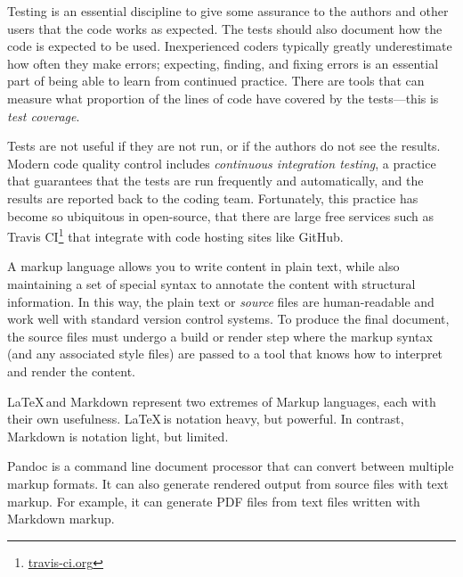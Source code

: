 Testing is an essential discipline to give some assurance to the authors and
other users that the code works as expected.
The tests should also document how the code is expected to be used.
Inexperienced coders typically greatly underestimate how often they make
errors; expecting, finding, and fixing errors is an essential part of being
able to learn from continued practice.
There are tools that can measure what proportion of the lines
of code have covered by the tests---this is \emph{test coverage}.


Tests are not useful if they are not run, or if the authors do not see the
results.  Modern code quality control includes \emph{continuous integration
testing}, a practice that guarantees that the tests are run frequently and
automatically, and the results are reported back to the coding team.
Fortunately, this practice has become so ubiquitous in open-source, that there
are large free services such as Travis
CI\footnote{\url{travis-ci.org}\label{travis-ci}} that integrate with code
hosting sites like GitHub.

%
A markup language allows you to write content in plain text, while also
maintaining a set of special syntax to annotate the content with structural
information.
In this way, the plain text or \emph{source} files are human-readable and work
well with standard version control systems.
To produce the final document, the source files must undergo a build or render
step where the markup syntax (and any associated style files) are passed to a
tool that knows how to interpret and render the content.

\LaTeX\,and Markdown represent two extremes of Markup languages, each
with their own usefulness.
\LaTeX\,is notation heavy, but powerful.
In contrast, Markdown is notation light, but limited.

Pandoc is a command line document processor that can convert between multiple
markup formats.  It can also generate rendered output from source files with
text markup.  For example, it can generate PDF files from text files written
with Markdown markup.

